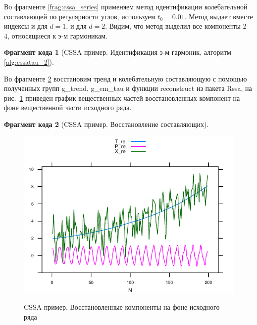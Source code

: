 \documentclass[specialist,
               substylefile = spbu.rtx,
               subf,href,colorlinks=true, 12pt]{disser}
\newtheorem{fragment}{Фрагмент кода}[section]
\newcommand{\bfgh}{\begin{figure}[!htbp]}
\newcommand{\efg}{\end{figure}}
\begin{document}
Во фрагменте \ref{frag:cssa_series} применяем метод идентификации колебательной составляющей по регулярности углов, используем $t_0 = 0.01$. Метод выдает вместе индексы и для $d=1$, и для $d=2$. 
Видим, что метод выделил все компоненты 2--4, относящиеся к э-м гармоникам.

\begin{fragment}[CSSA пример. Идентификация э-м гармоник, алгоритм \ref{alg:cssatau_2}]
\label{frag:cssa_em_tau}

\end{fragment}

Во фрагменте \ref{frag:cssa_rec} восстановим тренд и колебательную составляющую с помощью полученных групп g\_trend, g\_em\_tau и функции reconstruct из пакета Rssa, на рис.~\ref{fig:cssa_rec} приведен график вещественных частей восстановленных компонент на фоне вещественной части исходного ряда.
\begin{fragment}[CSSA пример. Восстановление составляющих]
\label{frag:cssa_rec}

\end{fragment}
\bfgh
        \begin{center}
{\includegraphics[width=4.5in]{cssa_rec}}
        \end{center}
        \caption{CSSA пример. Восстановленные компоненты на фоне исходного ряда}
        \label{fig:cssa_rec}
\efg
\end{document}
